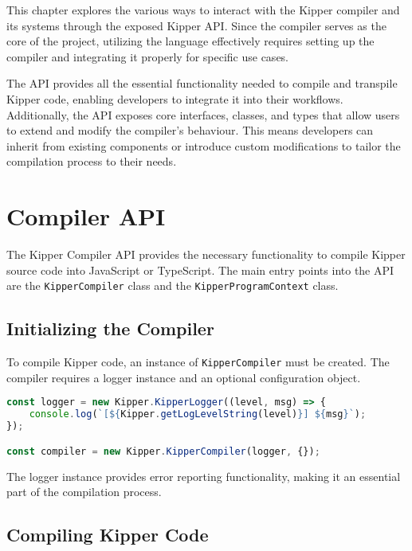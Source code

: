 
This chapter explores the various ways to interact with the Kipper compiler and its systems through the exposed Kipper API. Since the compiler serves as the core of the project, utilizing the language effectively requires setting up the compiler and integrating it properly for specific use cases.

The API provides all the essential functionality needed to compile and \gls{transpile} Kipper code, enabling developers to integrate it into their workflows. Additionally, the API exposes core interfaces, classes, and types that allow users to extend and modify the compiler’s behaviour. This means developers can inherit from existing components or introduce custom modifications to tailor the compilation process to their needs.

\section{Compiler API}
\label{sec:compiler_api}

The Kipper Compiler API provides the necessary functionality to compile Kipper source code into JavaScript or TypeScript. The main entry points into the API are the \lstinline|KipperCompiler| class and the \lstinline|KipperProgramContext| class.

\subsection{Initializing the Compiler}
\label{subsec:compiler_init}

To compile Kipper code, an instance of \lstinline|KipperCompiler| must be created. The compiler requires a logger instance and an optional configuration object.

\begin{lstlisting}[language=Typescript, caption=Initializing the Kipper Compiler, label=lst:compiler_initialization]
const logger = new Kipper.KipperLogger((level, msg) => {
	console.log(`[${Kipper.getLogLevelString(level)}] ${msg}`);
});

const compiler = new Kipper.KipperCompiler(logger, {});
\end{lstlisting}

The logger instance provides error reporting functionality, making it an essential part of the compilation process.

\subsection{Compiling Kipper Code}
\label{subsec:compiling}

